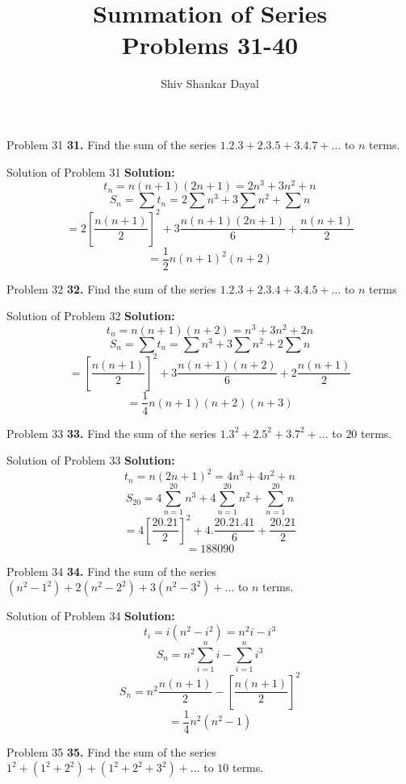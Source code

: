 \documentclass[aspectratio=1610,8pt]{beamer}
\title{Summation of Series\\Problems 31-40}
\author[Shiv Shankar Dayal]{Shiv Shankar Dayal}
\begin{document}
\begin{frame}
  \titlepage
\end{frame}
\begin{frame}{Problem 31}
  \textbf{31.} Find the sum of the series $1.2.3 + 2.3.5 + 3.4.7 + \ldots$ to $n$ terms.
\end{frame}
\begin{frame}{Solution of Problem 31}
  \textbf{Solution:} $$t_n = n(n + 1)(2n + 1) = 2n^3 + 3n^2 + n$$
  $$S_n = \sum t_n = 2\sum n^3 + 3\sum n^2 + \sum n$$
  $$= 2\left[\frac{n(n + 1)}{2}\right]^2 + 3\frac{n(n + 1)(2n + 1)}{6} + \frac{n(n + 1)}{2}$$
  $$= \frac{1}{2}n(n + 1)^2(n + 2)$$
\end{frame}
\begin{frame}{Problem 32}
  \textbf{32.} Find the sum of the series $1.2.3 + 2.3.4 + 3.4.5 + \ldots$ to $n$ terms
\end{frame}
\begin{frame}{Solution of Problem 32}
  \textbf{Solution:} $$t_n = n(n + 1)(n + 2) = n^3 + 3n^2 + 2n$$
  $$S_n = \sum t_n = \sum n^3 + 3\sum n^2 + 2\sum n$$
  $$= \left[\frac{n(n + 1)}{2}\right]^2 + 3\frac{n(n + 1)(n + 2)}{6} + 2\frac{n(n + 1)}{2}$$
  $$= \frac{1}{4}n(n + 1)(n + 2)(n + 3)$$
\end{frame}
\begin{frame}{Problem 33}
  \textbf{33.} Find the sum of the series $1.3^2 + 2.5^2 + 3.7^2 + \ldots$ to $20$ terms.
\end{frame}
\begin{frame}{Solution of Problem 33}
  \textbf{Solution:} $$t_n = n(2n + 1)^2 = 4n^3 + 4n^2 + n$$
  $$S_{20} = 4\sum_{n = 1}^{20}n^3 + 4\sum_{n = 1}^{20}n^2 + \sum_{n = 1}^{20}n$$
  $$= 4\left[\frac{20.21}{2}\right]^2 + 4.\frac{20.21.41}{6} + \frac{20.21}{2}$$
  $$= 188090$$
\end{frame}
\begin{frame}{Problem 34}
  \textbf{34.} Find the sum of the series $(n^2 - 1^2) + 2(n^2 - 2^2) + 3(n^2 - 3^2) + \ldots$ to $n$ terms.
\end{frame}
\begin{frame}{Solution of Problem 34}
  \textbf{Solution:}$$t_i = i(n^2 - i^2) = n^2i -i^3$$
  $$S_n = n^2\sum_{i = 1}^n i - \sum_{i = 1}^n i^3$$
  $$S_n = n^2\frac{n(n + 1)}{2} - \left[\frac{n(n + 1)}{2}\right]^2$$
  $$ = \frac{1}{4}n^2(n^2 - 1)$$
\end{frame}
\begin{frame}{Problem 35}
  \textbf{35.} Find the sum of the series $1^2 + (1^2 + 2^2) + (1^2 + 2^2 + 3^2) + \ldots$ to $10$ terms.
\end{frame}
\end{document}
